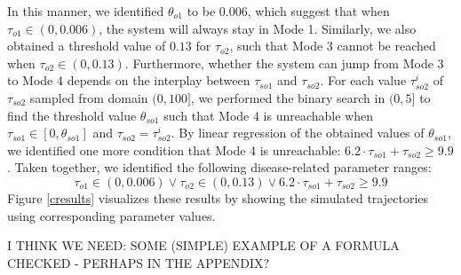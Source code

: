 In this manner, we identified $\theta_{o1}$ to be $0.006$, which suggest that when $\tau_{o1} \in (0, 0.006)$, the system will always stay in Mode 1. Similarly, we also obtained a threshold value of $0.13$ for $\tau_{o2}$, such that Mode 3 cannot be reached when $\tau_{o2} \in (0, 0.13)$. Furthermore, whether the system can jump from Mode 3 to Mode 4 depends on the interplay between $\tau_{so1}$ and $\tau_{so2}$.  For each value $\tau_{so2}^i$ of $\tau_{so2}$ sampled from domain $(0, 100]$, we performed the binary search in $(0, 5]$ to find the threshold value $\theta_{so1}$ such that Mode 4 is unreachable when $\tau_{so1} \in [0,\theta_{so1}]$ and $\tau_{so2} = {\tau_{so2}^i}$. By linear regression of the obtained values of $\theta_{so1}$, we identified one more condition that Mode 4 is unreachable:  $6.2 \cdot \tau_{so1} + \tau_{so2} \ge 9.9$. Taken together, we identified the following disease-related parameter ranges:
$$\tau_{o1} \in (0,0.006)\vee \tau_{o2} \in (0,0.13)\vee 6.2 \cdot \tau_{so1} + \tau_{so2} \ge 9.9$$
Figure \ref{cresults} visualizes these results by showing the simulated trajectories using corresponding  parameter values.



I THINK WE NEED: SOME (SIMPLE) EXAMPLE OF A FORMULA CHECKED - PERHAPS IN THE APPENDIX?


